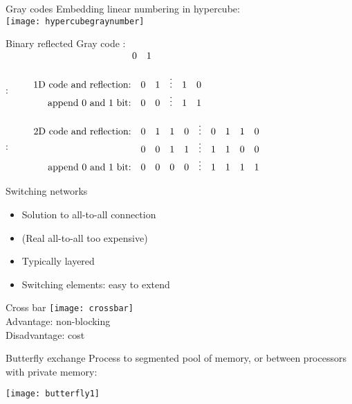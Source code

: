 \begin{numberedframe}{Gray codes}
    Embedding linear numbering in hypercube:\\
  \texttt{[image: hypercubegraynumber]}
\end{numberedframe}

\begin{numberedframe}{Binary reflected Gray code}
\small
\hbox{:
$\vcenter{$
\begin{array}{rll}
  \hphantom{1D code and reflection:}&0&1\\
\end{array}$}
$}

\hbox{:
$\vcenter{$
\begin{array}{rccccc}
  \hbox{1D code and reflection:}&0&1&\vdots&1&0\\
  \hbox{append 0 and 1 bit:}&0&0&\vdots&1&1
\end{array}$}
$}

\hbox{:
$\vcenter{$
\begin{array}{rccccccccc}
  \hbox{2D code and reflection:}&0&1&1&0&\vdots&0&1&1&0\\
  &0&0&1&1&\vdots&1&1&0&0\\
  \hbox{append 0 and 1 bit:}&0&0&0&0&\vdots&1&1&1&1
\end{array}$}
$}
\end{numberedframe}

\begin{numberedframe}{Switching networks}
  \begin{itemize}
  \item Solution to all-to-all connection
  \item (Real all-to-all too expensive)
  \item Typically layered
  \item Switching elements: easy to extend
  \end{itemize}
\end{numberedframe}

\begin{numberedframe}{Cross bar}
    \texttt{[image: crossbar]}\\
    Advantage: non-blocking\\
    Disadvantage: cost
\end{numberedframe}

\begin{numberedframe}{Butterfly exchange}
  Process to segmented pool of memory, or between processors with private memory:

    \texttt{[image: butterfly1]}
\end{numberedframe}

